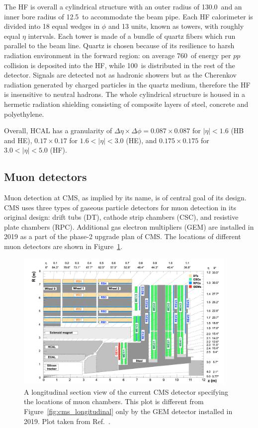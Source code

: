 The HF is overall a cylindrical structure with an outer radius of 130.0~\cm and an inner bore radius of 12.5~\cm to accommodate the beam pipe.
Each HF calorimeter is divided into 18 equal wedges in $\phi$ and 13 units, known as towers, with roughly equal $\eta$ intervals. 
Each tower is made of a bundle of quartz fibers which run parallel to the beam line.
Quartz is chosen because of its resilience to harsh radiation environment in the forward region:
on average 760~\GeV of energy per $pp$ collision is deposited into the HF, while 100~\GeV is distributed in the rest of the detector.
Signals are detected not as hadronic showers but as the Cherenkov radiation generated by charged particles in the quartz medium, 
therefore the HF is insensitive to neutral hadrons.
The whole cylindrical structure is housed in a hermetic radiation shielding consisting of composite layers of steel, concrete and polyethylene. 

Overall, HCAL has a granularity of $\Delta\eta \times \Delta\phi = 0.087 \times 0.087$ for $|\eta| < 1.6$ (HB and HE), 
$0.17 \times 0.17$ for $1.6 < |\eta| < 3.0$ (HE), and $0.175 \times 0.175$ for $3.0 < |\eta| < 5.0$ (HF).


\subsection{Muon detectors}\label{sec:muon_chambers}

Muon detection at CMS, as implied by its name, is of central goal of its design.
CMS uses three types of gaseous particle detectors for muon detection in its original design:
drift tubs (DT), cathode strip chambers (CSC), and resistive plate chambers (RPC).
Additional gas electron multipliers (GEM) are installed in 2019 as a part of the phase-2 upgrade plan of CMS. 
The locations of different muon detectors are shown in Figure~\ref{fig:cms_muons}.

\begin{figure}[!htb]
    \centering
    \captionsetup{justification=justified}
    \includegraphics[width=0.95\textwidth]{pics/LHC_CMS/muon_chambers.png}
    \caption{A longitudinal section view of the current CMS detector specifying the locations of muon chambers.
             This plot is different from Figure~\ref{fig:cms_longitudinal} only by the GEM detector installed in 2019.
             Plot taken from Ref.~\cite{Colaleo:2021453}.}
    \label{fig:cms_muons}
\end{figure}



